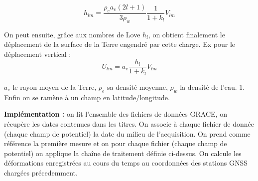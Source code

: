 \documentclass[11pt]{article}
\begin{document}
\[
h_{lm} = \frac{\rho_ea_e(2l+1)}{3\rho_w} \frac{1}{1+k_l} V_{lm}
\]

On peut ensuite, grâce aux nombres de Love \(h_l\), on obtient
finalement le déplacement de la surface de la Terre engendré par cette
charge. Ex pour le déplacement vertical : \[
U_{lm} = a_e \frac{h_l}{1+k_l} V_{lm}
\]

\(a_e\) le rayon moyen de la Terre, \(\rho_e\) sa densité moyenne,
\(\rho_w\) la densité de l'eau. 1. Enfin on se ramène à un champ en
latitude/longitude.

\textbf{Implémentation :} on lit l'ensemble des fichiers de données
GRACE, on récupère les dates contenues dans les titres. On associe à
chaque fichier de donnée (chaque champ de potentiel) la date du milieu
de l'acquisition. On prend comme référence la première mesure et on pour
chaque fichier (chaque champ de potentiel) on applique la chaîne de
traitement définie ci-dessus. On calcule les déformations enregistrées
au cours du temps au coordonnées des stations GNSS chargées
précedemment.
\end{document}

